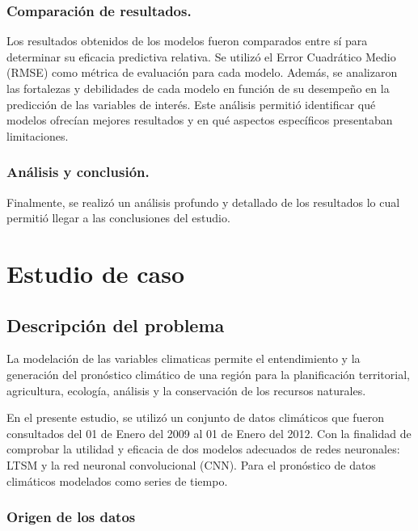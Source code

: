 \documentclass[
  us-letterpaper,
]{scrreprt}
\theoremstyle{plain}
\theoremstyle{definition}
\theoremstyle{definition}
\theoremstyle{remark}
\begin{document}
\subsection{Comparación de
resultados.}\label{comparaciuxf3n-de-resultados.}

Los resultados obtenidos de los modelos fueron comparados entre sí para
determinar su eficacia predictiva relativa. Se utilizó el Error
Cuadrático Medio (RMSE) como métrica de evaluación para cada modelo.
Además, se analizaron las fortalezas y debilidades de cada modelo en
función de su desempeño en la predicción de las variables de interés.
Este análisis permitió identificar qué modelos ofrecían mejores
resultados y en qué aspectos específicos presentaban limitaciones.

\subsection{Análisis y conclusión.}\label{anuxe1lisis-y-conclusiuxf3n.}

Finalmente, se realizó un análisis profundo y detallado de los
resultados lo cual permitió llegar a las conclusiones del estudio.

\chapter{Estudio de caso}\label{estudio-de-caso-1}

\section{Descripción del problema}\label{descripciuxf3n-del-problema}

La modelación de las variables climaticas permite el entendimiento y la
generación del pronóstico climático de una región para la planificación
territorial, agricultura, ecología, análisis y la conservación de los
recursos naturales.

En el presente estudio, se utilizó un conjunto de datos climáticos que
fueron consultados del 01 de Enero del 2009 al 01 de Enero del 2012. Con
la finalidad de comprobar la utilidad y eficacia de dos modelos
adecuados de redes neuronales: LTSM y la red neuronal convolucional
(CNN). Para el pronóstico de datos climáticos modelados como series de
tiempo.

\subsection{Origen de los datos}\label{origen-de-los-datos}
\end{document}
